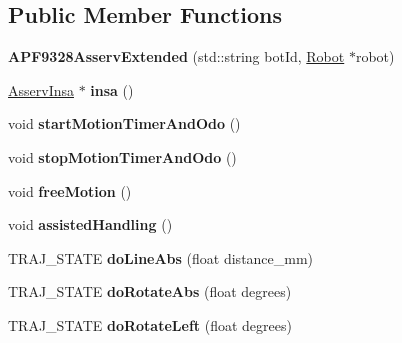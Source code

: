 \subsection*{Public Member Functions}
\begin{DoxyCompactItemize}
\item 
\mbox{\label{classAPF9328AsservExtended_aea0a2b3e2ea50ef90a20d22583db8ba3}} 
{\bfseries A\+P\+F9328\+Asserv\+Extended} (std\+::string bot\+Id, \hyperlink{classRobot}{Robot} $\ast$robot)
\item 
\mbox{\label{classAPF9328AsservExtended_a12777325ac1aafe19c71f7c4db050f78}} 
\hyperlink{classAsservInsa}{Asserv\+Insa} $\ast$ {\bfseries insa} ()
\item 
\mbox{\label{classAPF9328AsservExtended_a54310949c0c6c0dc1e4b0d9655e07c58}} 
void {\bfseries start\+Motion\+Timer\+And\+Odo} ()
\item 
\mbox{\label{classAPF9328AsservExtended_a85fca7d2c0c9c4fd15047dd1b7958e9c}} 
void {\bfseries stop\+Motion\+Timer\+And\+Odo} ()
\item 
\mbox{\label{classAPF9328AsservExtended_aad6e00415748c21069cb307a468af7e6}} 
void {\bfseries free\+Motion} ()
\item 
\mbox{\label{classAPF9328AsservExtended_a2fbf49f8eb9a7492400e9ca207ada202}} 
void {\bfseries assisted\+Handling} ()
\item 
\mbox{\label{classAPF9328AsservExtended_a0395ebe1676d7c13d1cfbfba6a0f616b}} 
T\+R\+A\+J\+\_\+\+S\+T\+A\+TE {\bfseries do\+Line\+Abs} (float distance\+\_\+mm)
\item 
\mbox{\label{classAPF9328AsservExtended_a4633b9452dcafa2a89f8403ce5ed7366}} 
T\+R\+A\+J\+\_\+\+S\+T\+A\+TE {\bfseries do\+Rotate\+Abs} (float degrees)
\item 
\mbox{\label{classAPF9328AsservExtended_a3b6f96a56ed81998a48240eaa6bf030b}} 
T\+R\+A\+J\+\_\+\+S\+T\+A\+TE {\bfseries do\+Rotate\+Left} (float degrees)

\end{DoxyCompactItemize}
